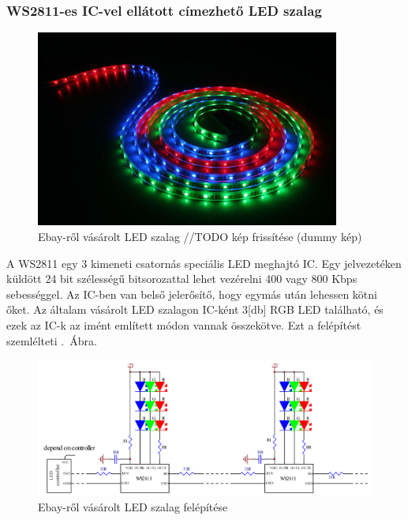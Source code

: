 \documentclass[../main.tex]{subfiles}
\begin{document}
        \subsubsection{WS2811-es IC-vel ellátott címezhető LED szalag}
            
            \begin{figure}[h!]
                \centering
                    \includegraphics[width=10cm]{resources/pcb_res/ledstrip.jpg}
                \caption{Ebay-ről vásárolt LED szalag //TODO kép frissítése (dummy kép)}
                \label{fig:ledstrip}
            \end{figure}
        
            A WS2811 egy 3 kimeneti csatornás speciális LED meghajtó IC. Egy jelvezetéken küldött 24 bit szélességű bitsorozattal lehet vezérelni 400 vagy 800 Kbps sebességgel. Az IC-ben van belső jelerősítő, hogy egymás után lehessen kötni őket. Az általam vásárolt LED szalagon IC-ként 3[db] RGB LED található, és ezek az IC-k az imént említett módon vannak összekötve. Ezt a felépítést szemlélteti .~Ábra.\\[12px]
            
            \begin{figure}[h!] %
                \centering
                \includegraphics[width=14cm]{resources/pcb_res/ledstrip_schematic.png}
                \caption{Ebay-ről vásárolt LED szalag felépítése}
                \label{fig:ledstrip_schematic}
            \end{figure}
            
\end{document}
